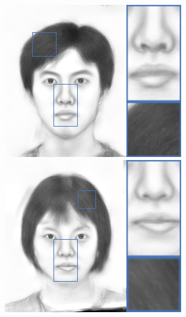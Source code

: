 \documentclass[10pt,twocolumn,letterpaper]{article}
\begin{document}
\begin{figure}[htbp]
{\begin{minipage}[b]{0.13\linewidth}
\includegraphics[width=0.99\linewidth]{img/sketch_result/ssd_s1.png}
\includegraphics[width=0.99\linewidth]{img/sketch_result/ssd_s2.png}

\end{minipage}}
\end{figure}
\end{document}
